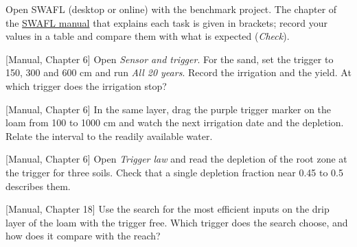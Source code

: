{\small Open SWAFL (desktop or online) with the benchmark project. The chapter of the \href{https://github.com/halilunaziru73-creator/Coupled-Water-Fluxes-Pore-Scale-Dynamics-Precision-Irrigation-Mulching-Feedback-Loops/raw/main/Software/v1.1.0/SWAFL_Desktop/docs/manual_v1.1.0/SWAFL_Manual_v1.1.0.pdf}{SWAFL manual} that explains each task is given in brackets; record your values in a table and compare them with what is expected (\emph{Check}).}\par\vspace{3pt}
\begin{exlist}
\item {\color{khblue}[Manual, Chapter 6]} Open \emph{Sensor and trigger}. For the sand, set the trigger to 150, 300 and 600 cm and run \emph{All 20 years}. Record the irrigation and the yield. At which trigger does the irrigation stop?\par{}
\item {\color{khblue}[Manual, Chapter 6]} In the same layer, drag the purple trigger marker on the loam from 100 to 1000 cm and watch the next irrigation date and the depletion. Relate the interval to the readily available water.\par{}
\item {\color{khblue}[Manual, Chapter 6]} Open \emph{Trigger law} and read the depletion of the root zone at the trigger for three soils. Check that a single depletion fraction near 0.45 to 0.5 describes them.\par{}
\item {\color{khblue}[Manual, Chapter 18]} Use the search for the most efficient inputs on the drip layer of the loam with the trigger free. Which trigger does the search choose, and how does it compare with the reach?\par{}
\end{exlist}
